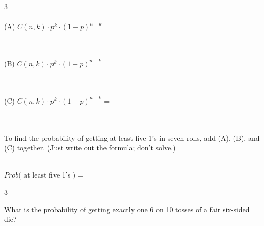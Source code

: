 \documentclass[a4paper,12pt]{book}
\newcounter{question}
\begin{document}
\begin{question}{\thequestion}{3}
            ~\\~\\
            (A) \tab $ C(n, k) \cdot p^{k} \cdot (1 - p)^{n-k} $ =
            
            ~\\~\\
            (B) \tab $ C(n, k) \cdot p^{k} \cdot (1 - p)^{n-k} $ =
            
            ~\\~\\
            (C) \tab $ C(n, k) \cdot p^{k} \cdot (1 - p)^{n-k} $ =

            ~\\~\\
            To find the probability of getting at least five 1's in seven rolls,
            add (A), (B), and (C) together. (Just write out the formula; don't solve.)

            ~\\
            $Prob($ at least five 1's $) = $
        \end{question}

        \notonkey{ \newpage }{ \hrulefill }
        
        \begin{question}{\thequestion}{3}
            
            What is the probability of getting exactly one 6 on 10 tosses
            of a fair six-sided die?

            
        \end{question}
\end{document}
